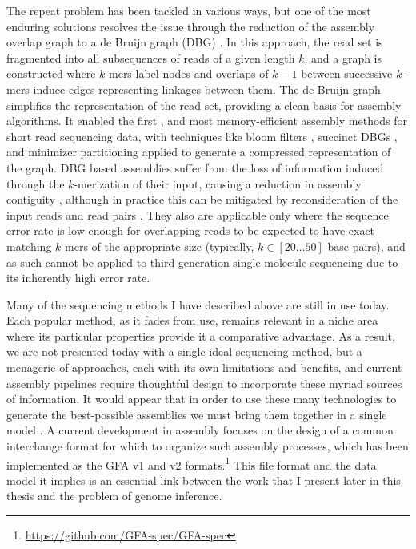 The repeat problem has been tackled in various ways, but one of the most enduring solutions resolves the issue through the reduction of the assembly overlap graph to a de Bruijn graph (DBG) \cite{pevzner2001eulerian}.
In this approach, the read set is fragmented into all subsequences of reads of a given length $k$, and a graph is constructed where $k$-mers label nodes and overlaps of $k-1$ between successive $k$-mers induce edges representing linkages between them.
The de Bruijn graph simplifies the representation of the read set, providing a clean basis for assembly algorithms.
It enabled the first \cite{zerbino2008velvet,simpson2009abyss,iqbal2012novo}, and most memory-efficient assembly methods for short read sequencing data, with techniques like bloom filters \cite{chikhi2013space}, succinct DBGs \cite{bowe2012succinct,li2015megahit}, and minimizer partitioning \cite{chikhi2016compacting} applied to generate a compressed representation of the graph.
DBG based assemblies suffer from the loss of information induced through the $k$-merization of their input, causing a reduction in assembly contiguity \cite{earl2011assemblathon}, although in practice this can be mitigated by reconsideration of the input reads and read pairs \cite{butler2008allpaths}.
They also are applicable only where the sequence error rate is low enough for overlapping reads to be expected to have exact matching $k$-mers of the appropriate size (typically, $k \in [20 \ldots 50]$ base pairs), and as such cannot be applied to third generation single molecule sequencing due to its inherently high error rate.

Many of the sequencing methods I have described above are still in use today.
Each popular method, as it fades from use, remains relevant in a niche area where its particular properties provide it a comparative advantage.
As a result, we are not presented today with a single ideal sequencing method, but a menagerie of approaches, each with its own limitations and benefits, and current assembly pipelines require thoughtful design to incorporate these myriad sources of information.
It would appear that in order to use these many technologies to generate the best-possible assemblies we must bring them together in a single model \cite{chaisson2018multi}.
A current development in assembly focuses on the design of a common interchange format for which to organize such assembly processes, which has been implemented as the GFA v1 and v2 formats.\footnote{\url{https://github.com/GFA-spec/GFA-spec}}
This file format and the data model it implies is an essential link between the work that I present later in this thesis and the problem of genome inference.

